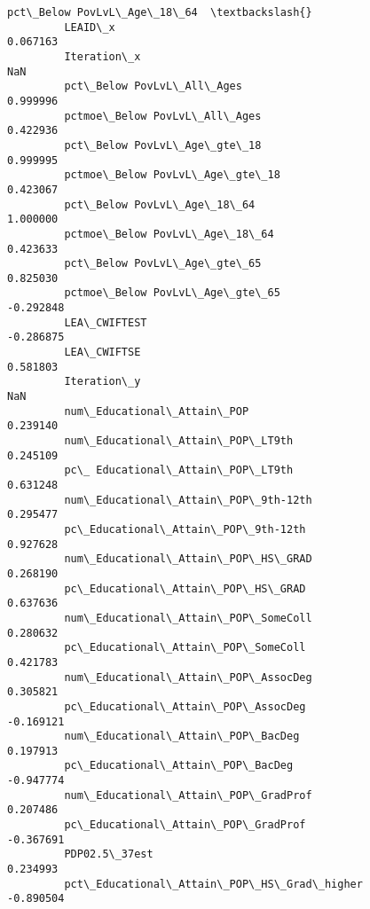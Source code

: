\documentclass[11pt]{article}
\begin{document}
\begin{Verbatim}[commandchars=\\\{\}]
                                                    pct\_Below PovLvL\_Age\_18\_64  \textbackslash{}
         LEAID\_x                                                      0.067163   
         Iteration\_x                                                       NaN   
         pct\_Below PovLvL\_All\_Ages                                    0.999996   
         pctmoe\_Below PovLvL\_All\_Ages                                 0.422936   
         pct\_Below PovLvL\_Age\_gte\_18                                  0.999995   
         pctmoe\_Below PovLvL\_Age\_gte\_18                               0.423067   
         pct\_Below PovLvL\_Age\_18\_64                                   1.000000   
         pctmoe\_Below PovLvL\_Age\_18\_64                                0.423633   
         pct\_Below PovLvL\_Age\_gte\_65                                  0.825030   
         pctmoe\_Below PovLvL\_Age\_gte\_65                              -0.292848   
         LEA\_CWIFTEST                                                -0.286875   
         LEA\_CWIFTSE                                                  0.581803   
         Iteration\_y                                                       NaN   
         num\_Educational\_Attain\_POP                                   0.239140   
         num\_Educational\_Attain\_POP\_LT9th                             0.245109   
         pc\_ Educational\_Attain\_POP\_LT9th                             0.631248   
         num\_Educational\_Attain\_POP\_9th-12th                          0.295477   
         pc\_Educational\_Attain\_POP\_9th-12th                           0.927628   
         num\_Educational\_Attain\_POP\_HS\_GRAD                           0.268190   
         pc\_Educational\_Attain\_POP\_HS\_GRAD                            0.637636   
         num\_Educational\_Attain\_POP\_SomeColl                          0.280632   
         pc\_Educational\_Attain\_POP\_SomeColl                           0.421783   
         num\_Educational\_Attain\_POP\_AssocDeg                          0.305821   
         pc\_Educational\_Attain\_POP\_AssocDeg                          -0.169121   
         num\_Educational\_Attain\_POP\_BacDeg                            0.197913   
         pc\_Educational\_Attain\_POP\_BacDeg                            -0.947774   
         num\_Educational\_Attain\_POP\_GradProf                          0.207486   
         pc\_Educational\_Attain\_POP\_GradProf                          -0.367691   
         PDP02.5\_37est                                                0.234993   
         pct\_Educational\_Attain\_POP\_HS\_Grad\_higher                   -0.890504   

\end{Verbatim}
\end{document}
